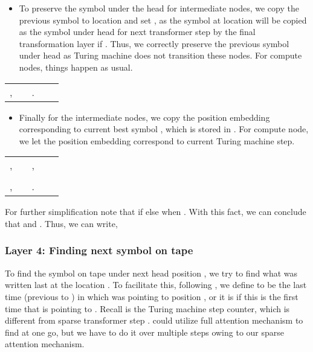 \documentclass{article}
\begin{document}
\begin{itemize}[leftmargin=6mm, itemsep=2mm, partopsep=0mm,parsep=0mm]
    \item To preserve the symbol under the head for intermediate nodes, we copy the previous symbol to  location and set , as the symbol at  location will be copied as the symbol under head for next transformer step by the final transformation layer if . Thus, we correctly preserve the previous symbol under head as Turing machine does not transition these nodes. For compute nodes, things happen as usual.
\end{itemize}
\begin{table}[h]
    \small
    \vspace{-3mm}
    \hspace*{12mm}
    \begin{tabular}{lclcl}
     ,
    &&
     .
    \end{tabular}
    \vspace{-3mm}
\end{table}
\begin{itemize}[leftmargin=6mm, itemsep=3mm, partopsep=0mm,parsep=0mm]
    \item Finally for the intermediate nodes, we copy the position embedding corresponding to current best symbol , which is stored in . For compute node, we let the position embedding correspond to current Turing machine step.
\end{itemize}
\vspace{-3mm}
\begin{table}[ht]
    \small
    \hspace*{12mm}
    \begin{tabular}{lclcl}
     ,
    &&
     ,
    \\\\
     ,
    &&
     .
    \end{tabular}
\end{table}

For further simplification note that  if  else  when . With this fact, we can conclude that  and . Thus, we can write,




\subsubsection{Layer 4: Finding next symbol on tape}
To find the symbol on tape under next head position , we try to find what was written last at the location .
To facilitate this, following \citep{Perez19}, we define  to be the last time (previous to ) in which  was pointing to position ,
or it is  if this is the first time that  is pointing to .
Recall  is the Turing machine step counter, which is different from sparse transformer step . \citep{Perez19} could utilize full attention mechanism to find  at one go, but we have to do it over multiple steps owing to our sparse attention mechanism.
\end{document}

